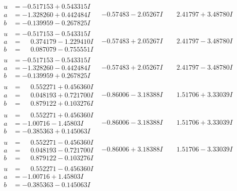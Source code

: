 \documentclass[1p]{elsarticle_modified}
\theoremstyle{definition}
\begin{document}
$$\begin{array}{c|c|c}
\begin{aligned}
u &= -0.517153 + 0.543315 I \\
a &= -1.328260 + 0.442484 I \\
b &= -0.139959 - 0.267825 I\end{aligned}
 & -0.57483 - 2.05267 I & \phantom{-}2.41797 + 3.48780 I \\ \hline\begin{aligned}
u &= -0.517153 - 0.543315 I \\
a &= \phantom{-}0.374179 - 1.229410 I \\
b &= \phantom{-}0.087079 - 0.755551 I\end{aligned}
 & -0.57483 + 2.05267 I & \phantom{-}2.41797 - 3.48780 I \\ \hline\begin{aligned}
u &= -0.517153 - 0.543315 I \\
a &= -1.328260 - 0.442484 I \\
b &= -0.139959 + 0.267825 I\end{aligned}
 & -0.57483 + 2.05267 I & \phantom{-}2.41797 - 3.48780 I \\ \hline\begin{aligned}
u &= \phantom{-}0.552271 + 0.456360 I \\
a &= \phantom{-}0.048193 + 0.721700 I \\
b &= \phantom{-}0.879122 + 0.103276 I\end{aligned}
 & -0.86006 - 3.18388 I & \phantom{-}1.51706 + 3.33039 I \\ \hline\begin{aligned}
u &= \phantom{-}0.552271 + 0.456360 I \\
a &= -1.00716 - 1.45803 I \\
b &= -0.385363 + 0.145063 I\end{aligned}
 & -0.86006 - 3.18388 I & \phantom{-}1.51706 + 3.33039 I \\ \hline\begin{aligned}
u &= \phantom{-}0.552271 - 0.456360 I \\
a &= \phantom{-}0.048193 - 0.721700 I \\
b &= \phantom{-}0.879122 - 0.103276 I\end{aligned}
 & -0.86006 + 3.18388 I & \phantom{-}1.51706 - 3.33039 I \\ \hline\begin{aligned}
u &= \phantom{-}0.552271 - 0.456360 I \\
a &= -1.00716 + 1.45803 I \\
b &= -0.385363 - 0.145063 I\end{aligned}

\end{array}$$
\end{document}
